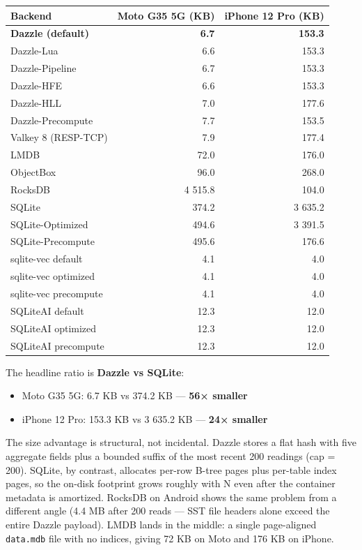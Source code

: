 {\def\LTcaptype{none} %
\begin{longtable}[]{@{}lrr@{}}
\toprule\noalign{}
Backend & Moto G35 5G (KB) & iPhone 12 Pro (KB) \\
\midrule\noalign{}
\endhead
\bottomrule\noalign{}
\endlastfoot
\textbf{Dazzle (default)} & \textbf{6.7} & \textbf{153.3} \\
Dazzle-Lua & 6.6 & 153.3 \\
Dazzle-Pipeline & 6.7 & 153.3 \\
Dazzle-HFE & 6.6 & 153.3 \\
Dazzle-HLL & 7.0 & 177.6 \\
Dazzle-Precompute & 7.7 & 153.5 \\
Valkey 8 (RESP-TCP) & 7.9 & 177.4 \\
LMDB & 72.0 & 176.0 \\
ObjectBox & 96.0 & 268.0 \\
RocksDB & 4 515.8 & 104.0 \\
SQLite & 374.2 & 3 635.2 \\
SQLite-Optimized & 494.6 & 3 391.5 \\
SQLite-Precompute & 495.6 & 176.6 \\
sqlite-vec default & 4.1 & 4.0 \\
sqlite-vec optimized & 4.1 & 4.0 \\
sqlite-vec precompute & 4.1 & 4.0 \\
SQLiteAI default & 12.3 & 12.0 \\
SQLiteAI optimized & 12.3 & 12.0 \\
SQLiteAI precompute & 12.3 & 12.0 \\
\end{longtable}
}

The headline ratio is \textbf{Dazzle vs SQLite}:

\begin{itemize}
\tightlist
\item
  Moto G35 5G: 6.7 KB vs 374.2 KB --- \textbf{56× smaller}
\item
  iPhone 12 Pro: 153.3 KB vs 3 635.2 KB --- \textbf{24× smaller}
\end{itemize}

The size advantage is structural, not incidental. Dazzle stores a flat hash with
five aggregate fields plus a bounded suffix of the most recent 200 readings (cap
= 200). SQLite, by contrast, allocates per-row B-tree pages plus per-table index
pages, so the on-disk footprint grows roughly with N even after the container
metadata is amortized. RocksDB on Android shows the same problem from a
different angle (4.4 MB after 200 reads --- SST file headers alone exceed the
entire Dazzle payload). LMDB lands in the middle: a single page-aligned
\texttt{data.mdb} file with no indices, giving 72 KB on Moto and 176 KB on
iPhone.

